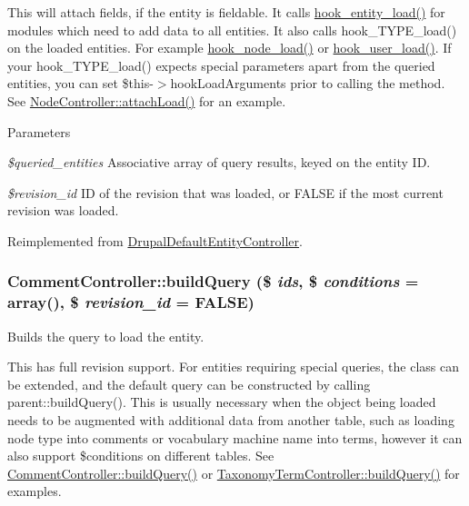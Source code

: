 This will attach fields, if the entity is fieldable. It calls \hyperlink{group__hooks_ga1f594647c8cbb27f75b77cc4118da8d6}{hook\_\-entity\_\-load()} for modules which need to add data to all entities. It also calls hook\_\-TYPE\_\-load() on the loaded entities. For example \hyperlink{group__node__api__hooks_gad48bb14b68ed38526029d1f7ac2d2de4}{hook\_\-node\_\-load()} or \hyperlink{group__hooks_ga81027843e38de3a899fa6e72f876d6b6}{hook\_\-user\_\-load()}. If your hook\_\-TYPE\_\-load() expects special parameters apart from the queried entities, you can set \$this-\/$>$hookLoadArguments prior to calling the method. See \hyperlink{classNodeController_abdc7525854d61d63fa6ee79bb2409359}{NodeController::attachLoad()} for an example.


\begin{DoxyParams}{Parameters}
\item[{\em \$queried\_\-entities}]Associative array of query results, keyed on the entity ID. \item[{\em \$revision\_\-id}]ID of the revision that was loaded, or FALSE if the most current revision was loaded. \end{DoxyParams}


Reimplemented from \hyperlink{classDrupalDefaultEntityController_a68735c41d2ba655a073c64983754edf7}{DrupalDefaultEntityController}.\hypertarget{classCommentController_a0feb93a67f87f04b06eb64eb0d359ca7}{
\subsubsection[{buildQuery}]{\setlength{\rightskip}{0pt plus 5cm}CommentController::buildQuery (\$ {\em ids}, \/  \$ {\em conditions} = {\ttfamily array()}, \/  \$ {\em revision\_\-id} = {\ttfamily FALSE})}}
\label{classCommentController_a0feb93a67f87f04b06eb64eb0d359ca7}
Builds the query to load the entity.

This has full revision support. For entities requiring special queries, the class can be extended, and the default query can be constructed by calling parent::buildQuery(). This is usually necessary when the object being loaded needs to be augmented with additional data from another table, such as loading node type into comments or vocabulary machine name into terms, however it can also support \$conditions on different tables. See \hyperlink{classCommentController_a0feb93a67f87f04b06eb64eb0d359ca7}{CommentController::buildQuery()} or \hyperlink{classTaxonomyTermController_a38102da86b43fb5b2c3c3412cb2ba3d2}{TaxonomyTermController::buildQuery()} for examples.


